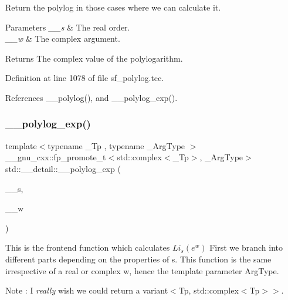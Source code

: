 Return the polylog in those cases where we can calculate it.


\begin{DoxyParams}{Parameters}
{\em \+\_\+\+\_\+s} & The real order. \\
\hline
{\em \+\_\+\+\_\+w} & The complex argument. \\
\hline
\end{DoxyParams}
\begin{DoxyReturn}{Returns}
The complex value of the polylogarithm. 
\end{DoxyReturn}


Definition at line 1078 of file sf\+\_\+polylog.\+tcc.



References \+\_\+\+\_\+polylog(), and \+\_\+\+\_\+polylog\+\_\+exp().

\mbox{\label{namespacestd_1_1____detail_a0f6f2fc92d4ccec43975a6b9aca9851a}} 
\subsubsection{\texorpdfstring{\+\_\+\+\_\+polylog\+\_\+exp()}{\_\_polylog\_exp()}}
{\footnotesize\ttfamily template$<$typename \+\_\+\+Tp , typename \+\_\+\+Arg\+Type $>$ \\
\+\_\+\+\_\+gnu\+\_\+cxx\+::fp\+\_\+promote\+\_\+t$<$std\+::complex$<$\+\_\+\+Tp$>$, \+\_\+\+Arg\+Type$>$ std\+::\+\_\+\+\_\+detail\+::\+\_\+\+\_\+polylog\+\_\+exp (\begin{DoxyParamCaption}\item[{\+\_\+\+Tp}]{\+\_\+\+\_\+s,  }\item[{\+\_\+\+Arg\+Type}]{\+\_\+\+\_\+w }\end{DoxyParamCaption})}

This is the frontend function which calculates $ Li_s(e^w) $ First we branch into different parts depending on the properties of s. This function is the same irrespective of a real or complex w, hence the template parameter Arg\+Type.

\begin{DoxyNote}{Note}
\+: I {\itshape really} wish we could return a variant$<$Tp, std\+::complex$<$\+Tp$>$$>$.
\end{DoxyNote}

